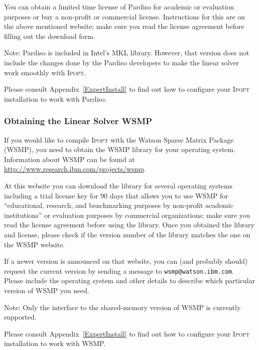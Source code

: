 \documentclass[10pt]{article}
\newcommand{\Ipopt}{\textsc{Ipopt}\xspace}
\begin{document}
You can obtain a limited time license of Pardiso for academic or
evaluation purposes or buy a non-profit or commercial
license. Instructions for this are on the above mentioned
website; make sure you read the license agreement before filling out
the download form.

Note: Pardiso is included in Intel's MKL library.  However, that
version does not include the changes done by the Pardiso developers to
make the linear solver work smoothly with \Ipopt.

Please consult Appendix~\ref{ExpertInstall} to find out how to
configure your \Ipopt installation to work with Pardiso.

\subsubsection{Obtaining the Linear Solver WSMP}\label{sec:WSMP}

If you would like to compile \Ipopt with the Watson Sparse Matrix
Package (WSMP), you need to obtain the WSMP library for your operating
system.  Information about WSMP can be found at
\url{http://www.research.ibm.com/projects/wsmp}.

At this website you can download the library for several operating systems
including a trial license key for 90 days that allows you to use WSMP
for ``educational, research, and benchmarking purposes by
non-profit academic institutions'' or evaluation purposes by commercial
organizations;
make sure you read the license agreement before using the library.
Once you obtained the library and license, please check if the version
number of the library matches the one on the WSMP website.

If a newer version is announced on that website, you can (and
probably should) request the current version by sending a message to
\verb|wsmp@watson.ibm.com|.  Please include the operating system and
other details to describe which particular version of WSMP you need.


Note: Only the interface to the shared-memory version of WSMP is
currently supported.

Please consult Appendix~\ref{ExpertInstall} to find out how to
configure your \Ipopt installation to work with WSMP.
\end{document}
